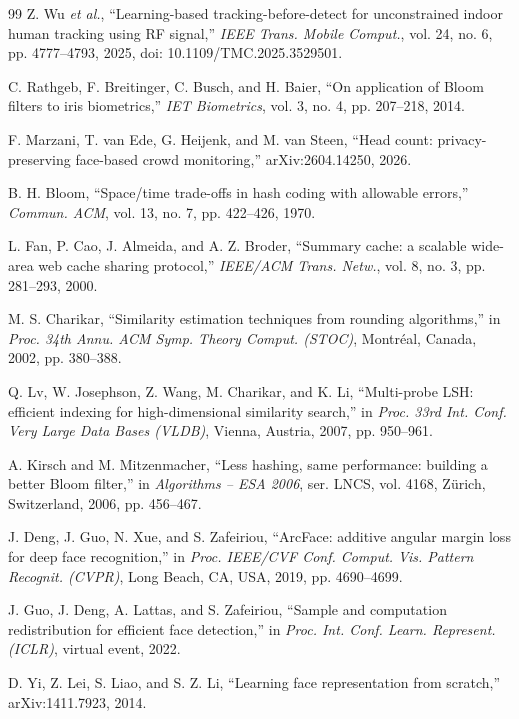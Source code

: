 \documentclass[12pt,a4paper,oneside]{report}
\begin{document}
\begin{thebibliography}{99}
Z. Wu \textit{et al.},
``Learning-based tracking-before-detect for unconstrained indoor human tracking using RF signal,''
\textit{IEEE Trans. Mobile Comput.},
vol. 24, no. 6, pp. 4777--4793,
2025, doi: 10.1109/TMC.2025.3529501.

C. Rathgeb, F. Breitinger, C. Busch, and H. Baier,
``On application of Bloom filters to iris biometrics,''
\textit{IET Biometrics},
vol. 3, no. 4, pp. 207--218,
2014.

F. Marzani, T. van Ede, G. Heijenk, and M. van Steen,
``Head count: privacy-preserving face-based crowd monitoring,''
arXiv:2604.14250, 2026.

B. H. Bloom,
``Space/time trade-offs in hash coding with allowable errors,''
\textit{Commun. ACM},
vol. 13, no. 7, pp. 422--426,
1970.

L. Fan, P. Cao, J. Almeida, and A. Z. Broder,
``Summary cache: a scalable wide-area web cache sharing protocol,''
\textit{IEEE/ACM Trans. Netw.},
vol. 8, no. 3, pp. 281--293,
2000.

M. S. Charikar,
``Similarity estimation techniques from rounding algorithms,''
in \textit{Proc. 34th Annu. ACM Symp. Theory Comput. (STOC)},
Montr\'eal, Canada, 2002, pp. 380--388.

Q. Lv, W. Josephson, Z. Wang, M. Charikar, and K. Li,
``Multi-probe LSH: efficient indexing for high-dimensional similarity search,''
in \textit{Proc. 33rd Int. Conf. Very Large Data Bases (VLDB)},
Vienna, Austria, 2007, pp. 950--961.

A. Kirsch and M. Mitzenmacher,
``Less hashing, same performance: building a better Bloom filter,''
in \textit{Algorithms -- ESA 2006}, ser. LNCS, vol. 4168,
Z\"urich, Switzerland, 2006, pp. 456--467.

J. Deng, J. Guo, N. Xue, and S. Zafeiriou,
``ArcFace: additive angular margin loss for deep face recognition,''
in \textit{Proc. IEEE/CVF Conf. Comput. Vis. Pattern Recognit. (CVPR)},
Long Beach, CA, USA, 2019, pp. 4690--4699.

J. Guo, J. Deng, A. Lattas, and S. Zafeiriou,
``Sample and computation redistribution for efficient face detection,''
in \textit{Proc. Int. Conf. Learn. Represent. (ICLR)},
virtual event, 2022.

D. Yi, Z. Lei, S. Liao, and S. Z. Li,
``Learning face representation from scratch,''
arXiv:1411.7923, 2014.


\end{thebibliography}
\end{document}

